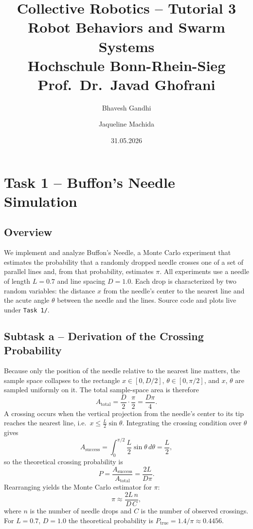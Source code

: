 \documentclass[12pt, a4paper]{article}
\title{
    \vspace{-1cm}
    \textbf{Collective Robotics -- Tutorial 3}\\[0.3em]
    \large Robot Behaviors and Swarm Systems\\[0.5em]
    \normalsize Hochschule Bonn-Rhein-Sieg\\
    Prof.\ Dr.\ Javad Ghofrani
}
\author{Bhavesh Gandhi \and Jaqueline Machida}
\date{31.05.2026}
\begin{document}
\maketitle
\thispagestyle{fancy}
\tableofcontents
\newpage

\section{Task 1 -- Buffon's Needle Simulation}

\subsection{Overview}

We implement and analyze Buffon's Needle, a Monte Carlo experiment
that estimates the probability that a randomly dropped needle crosses one of a
set of parallel lines and, from that probability, estimates $\pi$.  All
experiments use a needle of length $L = 0.7$ and line spacing $D = 1.0$.  Each
drop is characterized by two random variables: the distance $x$ from the
needle's center to the nearest line and the acute angle $\theta$ between the
needle and the lines.  Source code and plots live under \texttt{Task~1/}.

\subsection{Subtask a -- Derivation of the Crossing Probability}

Because only the position of the needle relative to the nearest line
matters, the sample space collapses to the rectangle $x \in [0, D/2]$,
$\theta \in [0, \pi/2]$, and $x$, $\theta$ are sampled uniformly on it.  The
total sample-space area is therefore
\[
    A_{\text{total}} = \frac{D}{2} \cdot \frac{\pi}{2} = \frac{D\pi}{4}.
\]
A crossing occurs when the vertical projection from the needle's center to
its tip reaches the nearest line, i.e.\ $x \le \tfrac{L}{2}\sin\theta$.
Integrating the crossing condition over $\theta$ gives
\[
    A_{\text{success}} = \int_0^{\pi/2} \frac{L}{2}\sin\theta\, d\theta
    = \frac{L}{2},
\]
so the theoretical crossing probability is
\[
    P = \frac{A_{\text{success}}}{A_{\text{total}}} = \frac{2L}{D\pi}.
\]
Rearranging yields the Monte Carlo estimator for $\pi$:
\[
    \pi \approx \frac{2L\,n}{D\,C},
\]
where $n$ is the number of needle drops and $C$ is the number of observed
crossings.  For $L = 0.7$, $D = 1.0$ the theoretical probability is
$P_{\text{true}} = 1.4/\pi \approx 0.4456$.
\end{document}
